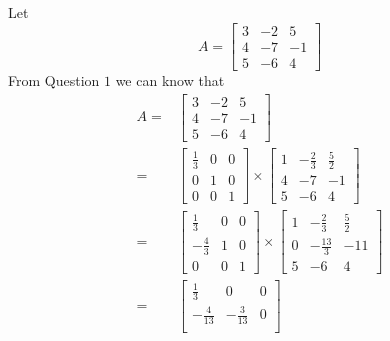 \documentclass{article}
\begin{document}
        \subsection{}
        Let $$A=\begin{bmatrix}
            3&-2&5\\
            4&-7&-1\\
            5&-6&4
        \end{bmatrix}$$
        From Question $1$ we can know that 
        \begin{equation*}
            \begin{split}
                A=&\begin{bmatrix}
                    3&-2&5\\
                    4&-7&-1\\
                    5&-6&4
                \end{bmatrix}\\
                =&\begin{bmatrix}
                    \frac{1}{3}&0&0\\
                    0&1&0\\
                    0&0&1
                \end{bmatrix}\times
                \begin{bmatrix}
                    1&-\frac{2}{3}&\frac{5}{2}\\
                    4&-7&-1\\
                    5&-6&4
                \end{bmatrix}\\
                =&\begin{bmatrix}
                    \frac{1}{3}&0&0\\
                    -\frac{4}{3}&1&0\\
                    0&0&1
                \end{bmatrix}\times\begin{bmatrix}
                    1&-\frac{2}{3}&\frac{5}{2}\\
                    0&-\frac{13}{3}&-11\\
                    5&-6&4
                \end{bmatrix}\\
                =&\begin{bmatrix}
                    \frac{1}{3}&0&0\\
                    -\frac{4}{13}&-\frac{3}{13}&0\\

\end{bmatrix}
\end{split}
\end{equation*}
\end{document}
